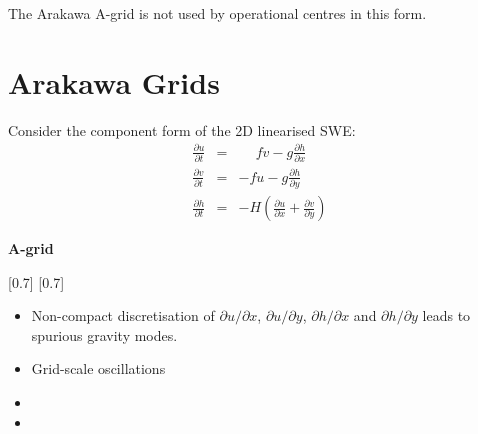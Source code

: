 The Arakawa A-grid is not used by operational centres in this form.

\clearpage{}

\section*{Arakawa Grids \citep{AL77}}

Consider the component form of the 2D linearised SWE:
\begin{eqnarray}
\frac{\partial u}{\partial t} & = & \phantom{-}fv-g\frac{\partial h}{\partial x}\label{eq:linSWEu}\\
\frac{\partial v}{\partial t} & = & -fu-g\frac{\partial h}{\partial y}\label{eq:linSWEv}\\
\frac{\partial h}{\partial t} & = & -H\left(\frac{\partial u}{\partial x}+\frac{\partial v}{\partial y}\right)\label{eq:linSWEh}
\end{eqnarray}
\begin{minipage}[t]{0.28\columnwidth}%
\begin{center}
\textbf{A-grid}
\par\end{center}
%
{\scalebox{0.7}[0.7]{}}
{\scalebox{0.7}[0.7]{}}%
\end{minipage} %
\begin{minipage}[t]{0.7\columnwidth}%
\phantom{}
\begin{itemize}
\item Non-compact discretisation of $\partial u/\partial x$, $\partial u/\partial y$,
$\partial h/\partial x$ and $\partial h/\partial y$ leads to spurious
gravity modes. 
\item Grid-scale oscillations 
\item {}
\item {}
\end{itemize}
%
\end{minipage}

